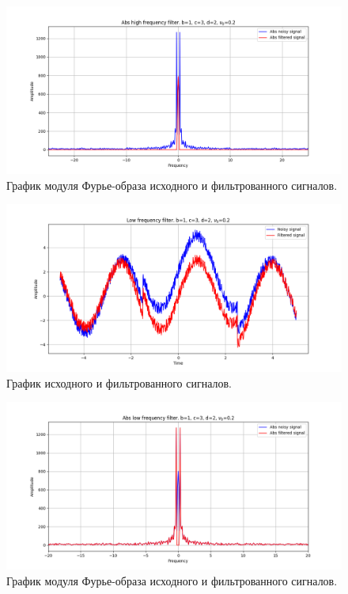 \documentclass[a4paper, 12pt]{article}
\begin{document}
    \begin{figure}[!htb]
        \centering
        \includegraphics[scale=0.485]{4_abs_u_U_nospec_v3.png}
        \captionsetup{skip=0pt}
        \caption{График модуля Фурье-образа исходного и фильтрованного сигналов.}
        \label{fig:fig90}
    \end{figure}
    \begin{figure}[!htb]
        \centering
        \includegraphics[scale=0.485]{4_u_flt_u_nospec_v4.png}
        \captionsetup{skip=0pt}
        \caption{График исходного и фильтрованного сигналов.}
        \label{fig:fig91}
    \end{figure}
    \begin{figure}[!htb]
        \centering
        \includegraphics[scale=0.485]{4_abs_u_U_nospec_v4.png}
        \captionsetup{skip=0pt}
        \caption{График модуля Фурье-образа исходного и фильтрованного сигналов.}
        \label{fig:fig92}
    \end{figure}
\end{document}
